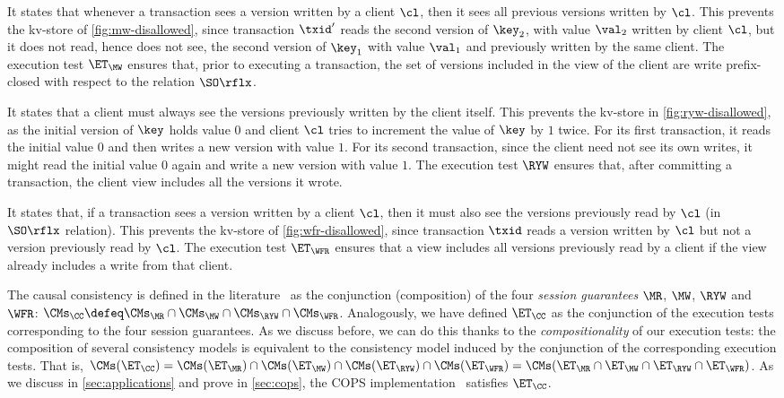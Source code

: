 It states that whenever a transaction sees a version written by a client $\cl$,
then it sees all previous versions written by $\cl$. 
This prevents \eg the kv-store of \cref{fig:mw-disallowed}, since 
transaction $\txid'$ reads the second version of $\key_2$, 
with value $\val_2$ written by client $\cl$, 
but it does not read, hence does not see, the second version of $\key_1$
with value $\val_1$ and previously written by the same client.
The execution test $\ET_{\MW}$  ensures that, prior to executing a transaction,
the set of versions included in the view of the client are write 
prefix-closed with respect to the relation $\SO\rflx$.

It states that a client must always see the versions previously written by the client itself.
This prevents the kv-store in \cref{fig:ryw-disallowed}, 
as the initial version of $\key$ holds value $0$ 
and client $\cl$ tries to increment the value of $\key$ by $1$ twice.  
For its first transaction, it reads the initial value $0$ and then writes a new version with value $1$. 
For its second transaction, since the client need not see its own writes, 
it might read the initial value $0$ again and write a new version with value $1$.
The execution test $\RYW$ ensures that, after committing a transaction, 
the client view includes all the versions it wrote.  
 


It states that, if a transaction sees a version written by a
client $\cl$, then it must also see the versions previously read by $\cl$ (in $\SO\rflx$ relation).
This prevents the kv-store of \cref{fig:wfr-disallowed},
since transaction $\txid$ reads a version written by $\cl$ but
not a version previously read by $\cl$.
The execution test $\ET_{\WFR}$ ensures
that a view includes all versions previously read by a client 
if the view already includes a write from that client. 

The causal consistency is defined in the literature~\cite{session2causal} 
as the conjunction (composition) of the four \emph{session guarantees} \(\MR\), \(\MW\), \(\RYW\) and \(\WFR\):   
$\CMs_{\CC} \defeq \CMs_{\MR} \cap \CMs_{\MW} \cap \CMs_{\RYW} \cap \CMs_{\WFR}$. 
Analogously, we have defined $\ET_\CC$ as the conjunction of the execution tests corresponding to the four session guarantees.
As we discuss before, we can do this thanks to the \emph{compositionality} of our execution tests:
the composition of several consistency models is equivalent to the consistency model induced by the conjunction of the corresponding execution tests. 
That is, $\CMs(\ET_\CC) = \CMs(\ET_{\MR}) \cap \CMs(\ET_{\MW}) \cap
\CMs(\ET_{\RYW}) \cap \CMs(\ET_{\WFR}) = \CMs(\ET_{\MR} \cap
\ET_{\MW} \cap \ET_{\RYW} \cap \ET_{\WFR})$.
As we discuss in \cref{sec:applications} and prove in \ref{sec:cops}, the COPS
implementation~\cite{cops} satisfies $\ET_{\CC}$. 

